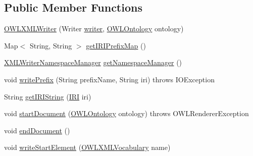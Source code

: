 \subsection*{Public Member Functions}
\begin{DoxyCompactItemize}
\item 
\hyperlink{classorg_1_1coode_1_1owlapi_1_1owlxml_1_1renderer_1_1_o_w_l_x_m_l_writer_a43e210ffe61b38f6c61e16d77ae3e8c9}{O\-W\-L\-X\-M\-L\-Writer} (Writer \hyperlink{classorg_1_1coode_1_1owlapi_1_1owlxml_1_1renderer_1_1_o_w_l_x_m_l_writer_a24cf98dc6ff2672642fb9e36e814078f}{writer}, \hyperlink{interfaceorg_1_1semanticweb_1_1owlapi_1_1model_1_1_o_w_l_ontology}{O\-W\-L\-Ontology} ontology)
\item 
Map$<$ String, String $>$ \hyperlink{classorg_1_1coode_1_1owlapi_1_1owlxml_1_1renderer_1_1_o_w_l_x_m_l_writer_a5ef4855a380a51cc833a92ea0990fd31}{get\-I\-R\-I\-Prefix\-Map} ()
\item 
\hyperlink{classorg_1_1coode_1_1xml_1_1_x_m_l_writer_namespace_manager}{X\-M\-L\-Writer\-Namespace\-Manager} \hyperlink{classorg_1_1coode_1_1owlapi_1_1owlxml_1_1renderer_1_1_o_w_l_x_m_l_writer_acdd173035a275529e67470596585cf9d}{get\-Namespace\-Manager} ()
\item 
void \hyperlink{classorg_1_1coode_1_1owlapi_1_1owlxml_1_1renderer_1_1_o_w_l_x_m_l_writer_aa981f38fd3c37c0c31af078b876fad1f}{write\-Prefix} (String prefix\-Name, String iri)  throws I\-O\-Exception 
\item 
String \hyperlink{classorg_1_1coode_1_1owlapi_1_1owlxml_1_1renderer_1_1_o_w_l_x_m_l_writer_af2ecfc43c218604d5aec1d66c1bcfb32}{get\-I\-R\-I\-String} (\hyperlink{classorg_1_1semanticweb_1_1owlapi_1_1model_1_1_i_r_i}{I\-R\-I} iri)
\item 
void \hyperlink{classorg_1_1coode_1_1owlapi_1_1owlxml_1_1renderer_1_1_o_w_l_x_m_l_writer_ae8957db3400a3cd90a5c89da2bc4471b}{start\-Document} (\hyperlink{interfaceorg_1_1semanticweb_1_1owlapi_1_1model_1_1_o_w_l_ontology}{O\-W\-L\-Ontology} ontology)  throws O\-W\-L\-Renderer\-Exception 
\item 
void \hyperlink{classorg_1_1coode_1_1owlapi_1_1owlxml_1_1renderer_1_1_o_w_l_x_m_l_writer_a61fa8ed94a9c0709318ba48ded487666}{end\-Document} ()
\item 
void \hyperlink{classorg_1_1coode_1_1owlapi_1_1owlxml_1_1renderer_1_1_o_w_l_x_m_l_writer_a8d64929aa89c04146b4fc9462c7c1b62}{write\-Start\-Element} (\hyperlink{enumorg_1_1semanticweb_1_1owlapi_1_1vocab_1_1_o_w_l_x_m_l_vocabulary}{O\-W\-L\-X\-M\-L\-Vocabulary} name)
\item 

\end{DoxyCompactItemize}
